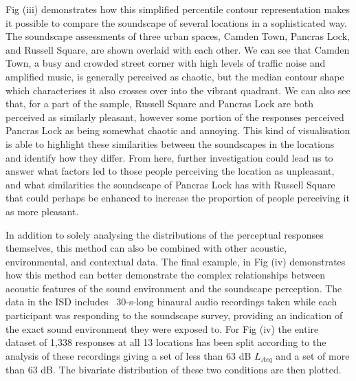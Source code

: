 Fig (iii) demonstrates how this simplified  percentile contour representation makes it possible to compare the soundscape of several locations in a sophisticated way. The soundscape assessments of three urban spaces, Camden Town, Pancras Lock, and Russell Square, are shown overlaid with each other. We can see that Camden Town, a busy and crowded street corner with high levels of traffic noise and amplified music, is generally perceived as chaotic, but the median contour shape which characterises it also crosses over into the vibrant quadrant. We can also see that, for a part of the sample, Russell Square and Pancras Lock are both perceived as similarly pleasant, however some portion of the responses perceived Pancras Lock as being somewhat chaotic and annoying. This kind of visualisation is able to highlight these similarities between the soundscapes in the locations and identify how they differ. From here, further investigation could lead us to answer what factors led to those people perceiving the location as unpleasant, and what similarities the soundscape of Pancras Lock has with Russell Square that could perhaps be enhanced to increase the proportion of people perceiving it as more pleasant.

In addition to solely analysing the distributions of the perceptual responses themselves, this method can also be combined with other acoustic, environmental, and contextual data. The final example, in Fig (iv) demonstrates how this method can better demonstrate the complex relationships between acoustic features of the sound environment and the soundscape perception. The data in the ISD includes ~30-s-long binaural audio recordings taken while each participant was responding to the soundscape survey, providing an indication of the exact sound environment they were exposed to. For Fig (iv) the entire dataset of 1,338 responses at all 13 locations has been split according to the analysis of these recordings giving a set of less than 63 dB $L_{Aeq}$ and a set of more than 63 dB. The bivariate distribution of these two conditions are then plotted.

